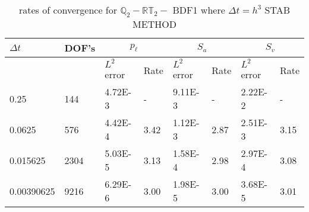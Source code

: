 \begin{table}[ht]
	\centering
	\begin{tabular}{|l|l|l|l|l|l|l|l|}
		\hline
		$\Delta t$ & DOF's & \multicolumn{2}{c|}{$p_{\ell}$} & \multicolumn{2}{c|}{$S_a$} & \multicolumn{2}{c|}{$S_v$}  \\ \hline
		& & $L^2$ error & Rate & $L^2$ error & Rate & $L^2$ error & Rate \\ \hline
		0.25   	  & 144   & 4.72E-3 & -	   & 9.11E-3 & -    & 2.22E-2 & - \\ \hline
		0.0625    & 576   & 4.42E-4 & 3.42 & 1.12E-3 & 2.87 & 2.51E-3 & 3.15 \\ \hline
		0.015625  & 2304  & 5.03E-5 & 3.13 & 1.58E-4 & 2.98 & 2.97E-4 & 3.08 \\ \hline
		0.00390625& 9216  & 6.29E-6 & 3.00 & 1.98E-5 & 3.00 & 3.68E-5 & 3.01 \\ \hline 
	\end{tabular}
	\caption[Template table-description for list of tables.]{ rates of convergence for $\mathbb{Q}_2 - \mathbb{RT}_2-$ BDF1 where $\Delta t = h^3$  STAB METHOD }
\end{table}





